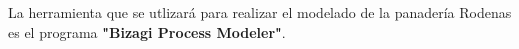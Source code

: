 La herramienta que se utlizará para realizar el modelado de la panadería Rodenas es el programa \textbf{"Bizagi Process Modeler"}.